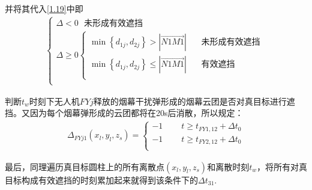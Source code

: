 \documentclass[../main.tex]{subfiles}
\begin{document}
\begin{itemize}
并将其代入\eqref{1.19}中即
\begin{align}\label{1.98}
	\left\{ \begin{array}{l}
	\varDelta <0\ \ \ \text{未形成有效遮挡}\\
	\varDelta \ge 0\left\{ \begin{array}{l}
	\min \left\{ d_{1j},d_{2j} \right\} >\left| \overrightarrow{N1M1} \right|\ \ \ \ \ \ \ \ \text{未形成有效遮挡}\\
	\min \left\{ d_{1j},d_{2j} \right\} \le \left| \overrightarrow{N1M1} \right|\ \ \ \ \ \ \ \ \text{有效遮挡}\\
\end{array} \right.\\
\end{array} \right. 
\end{align}
\par 判断$t_w$时刻下无人机$FYj$释放的烟幕干扰弹形成的烟幕云团是否对真目标进行遮挡。又因为每个烟幕弹形成的云团都将在20s后消散，所以规定： 
\begin{align}\label{14.9}
	\Delta _{FYj1}\left( x_l,y_l,z_s \right) =\left\{ \begin{array}{l}
	-1\ \ \ \ \ \ \ \ \ \ t\ge t_{FY1,12}+\Delta t_0\\
	-1\ \ \ \ \ \ \ \ \ \ t\ge t_{FY2,12}+\Delta t_0\\
\end{array} \right.
\end{align}
\end{itemize}
最后，同理遍历真目标圆柱上的所有离散点$(x_l,y_l,z_s)$和离散时刻$t_w$，将所有对真目标构成有效遮挡的时刻累加起来就得到该条件下的$\Delta t_{31}$.
\end{document}
